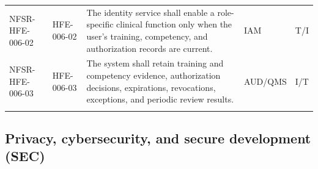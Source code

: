 \documentclass[11pt,letterpaper]{article}
\begin{document}
\begin{scriptsize}
\begin{longtable}{@{}L{0.16\textwidth}L{0.105\textwidth}L{0.435\textwidth}L{0.12\textwidth}L{0.08\textwidth}@{}}
\addlinespace[2pt]
\mbox{NFSR-HFE-006-02} & \mbox{HFE-006-02} & The identity service shall enable a role-specific clinical function only when the user's training, competency, and authorization records are current. & IAM & T\slash\allowbreak{}I \\
\addlinespace[2pt]
\mbox{NFSR-HFE-006-03} & \mbox{HFE-006-03} & The system shall retain training and competency evidence, authorization decisions, expirations, revocations, exceptions, and periodic review results. & AUD\slash\allowbreak{}QMS & I\slash\allowbreak{}T \\
\addlinespace[2pt]
\end{longtable}
\end{scriptsize}

\subsection{Privacy, cybersecurity, and secure development (SEC)}
\end{document}
